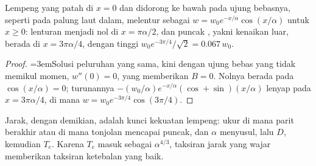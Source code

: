 \begin{proposition}\label{prop:b3:gravity-geodesy:broken}
Lempeng yang patah di $x = 0$ dan didorong ke bawah pada ujung bebasnya, seperti pada
palung laut dalam, melentur sebagai $w = w_0e^{-x/\alpha}\cos(x/\alpha)$ untuk $x \ge 0$:
lenturan menjadi nol di $x = \pi\alpha/2$, dan puncak , yakni
kenaikan luar, berada di $x = 3\pi\alpha/4$, dengan tinggi $w_0e^{-3\pi/4}/\sqrt2 =
\num{0.067}\,w_0$.
\end{proposition}

\begin{proof}
\begingroup\emergencystretch=3em\relax Solusi peluruhan yang sama, kini dengan ujung bebas yang tidak memikul momen,
$w''(0) = 0$, yang memberikan $B = 0$. Nolnya berada pada $\cos(x/\alpha) = 0$;
turunannya $-(w_0/\alpha)e^{-x/\alpha}(\cos + \sin)(x/\alpha)$ lenyap pada
$x = 3\pi\alpha/4$, di mana $w = w_0e^{-3\pi/4}\cos(3\pi/4)$.
\par\endgroup\end{proof}

Jarak, dengan demikian, adalah kunci kekuatan lempeng: ukur di mana parit
berakhir atau di mana tonjolan mencapai puncak, dan $\alpha$ menyusul, lalu $D$, kemudian $T_e$.
Karena $T_e$ masuk sebagai $\alpha^{4/3}$, taksiran jarak yang wajar memberikan
taksiran ketebalan yang baik.

